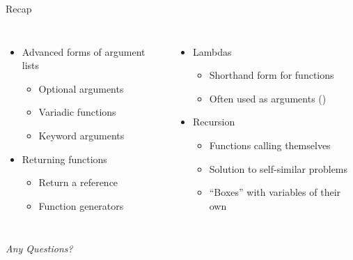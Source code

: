 
\begin{frame}[t,plain]
\titlepage
\end{frame}


\begin{frame}{Recap}
%
\begin{columns}[T]
\begin{itemize}
\item Advanced forms of argument lists
	\begin{itemize}
	\item Optional arguments
	\item Variadic functions
	\item Keyword arguments
	\end{itemize}
\item Returning functions
	\begin{itemize}
	\item Return a reference
	\item Function generators
	\end{itemize}
\end{itemize}
%
\begin{itemize}
\item Lambdas
	\begin{itemize}
	\item Shorthand form for functions
	\item Often used as arguments (\thus {})
	\end{itemize}
\item Recursion
	\begin{itemize}
	\item Functions calling themselves
	\item Solution to self-similar problems
	\item \enquote{Boxes} with variables of their own
	\end{itemize}
\end{itemize}

\end{columns}
%
\begin{center}
	\emph{Any Questions?}
\end{center}
%
\end{frame}

